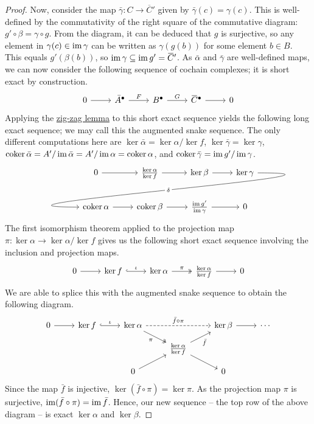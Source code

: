 \documentclass[a4paper,12pt]{article}
\begin{document}
\begin{proof}
    Now, consider the map $\bar{\gamma} \colon C \to \overbar{C}'$ given by $\bar{\gamma}(c) = \gamma(c)$.
    This is well-defined by the commutativity of the right square of the commutative diagram: $g' \circ \beta = \gamma \circ g$.
    From the diagram, it can be deduced that $g$ is surjective, so any element in $\gamma(c) \in \operatorname{im} \gamma$ can be written as $\gamma(g(b))$ for some element $b \in B$.
    This equals $g'(\beta(b))$, so $\im \gamma \subseteq \im g' = \overbar{C}'$.
    As $\bar{\alpha}$ and $\bar{\gamma}$ are well-defined maps, we can now consider the following sequence of cochain complexes; it is short exact by construction.
    \[\begin{tikzcd}
	0 & {\bar{A}^\bullet} & {B^\bullet} & {\overbar{C}^\bullet} & 0
	\arrow[from=1-1, to=1-2]
	\arrow["F", from=1-2, to=1-3]
	\arrow["G", from=1-3, to=1-4]
	\arrow[from=1-4, to=1-5]
    \end{tikzcd}\]
    Applying the \hyperref[lem:zig-zag_lemma]{zig-zag lemma} to this short exact sequence yields the following long exact sequence; we may call this the augmented snake sequence.
    The only different computations here are $\ker \bar{\alpha} = \ker \alpha / \ker f$, $\ker \bar{\gamma} = \ker \gamma$, $\operatorname{coker} \bar{\alpha} = A' / \operatorname{im} \bar{\alpha} = A' / \operatorname{im} \alpha = \operatorname{coker} \alpha$, and $\operatorname{coker} \bar{\gamma} = \operatorname{im} g' / \operatorname{im} \gamma$.
    \[\begin{tikzcd}
        & 0 \ar[r] & \frac{\ker \alpha}{\ker f} \ar[r] & \ker \beta \ar[r] & \ker \gamma \arrow[out=0, in=180, looseness=2, overlay, llld, "\delta"{description}]\\
        & \coker \alpha \ar[r] & \coker \beta \ar[r] & \frac{\im g'}{\im \gamma} \ar[r] & 0
    \end{tikzcd}\]
    The first isomorphism theorem applied to the projection map $\pi \colon \ker \alpha \to \ker \alpha / \ker f$ gives us the following short exact sequence involving the inclusion and projection maps. 
    \[\begin{tikzcd}
	0 & {\ker f} & {\ker \alpha} & {\frac{\ker \alpha}{\ker f}} & 0
	\arrow[from=1-1, to=1-2]
	\arrow["\iota", hook, from=1-2, to=1-3]
	\arrow["\pi", two heads, from=1-3, to=1-4]
	\arrow[from=1-4, to=1-5]
    \end{tikzcd}\]
    We are able to splice this with the augmented snake sequence to obtain the following diagram.
    \[\begin{tikzcd}[row sep=small]
	0 & {\ker f} & {\ker \alpha} && {\ker \beta} & \cdots \\
	&&& {\frac{\ker \alpha}{\ker f}} \\
	&& 0 && 0
	\arrow[from=1-1, to=1-2]
	\arrow["\iota", hook, from=1-2, to=1-3]
	\arrow["{\bar{f} \circ \pi}", dashed, from=1-3, to=1-5]
	\arrow["\pi"', two heads, from=1-3, to=2-4]
	\arrow[from=1-5, to=1-6]
	\arrow["{\bar{f}}"', from=2-4, to=1-5]
	\arrow[from=2-4, to=3-5]
	\arrow[from=3-3, to=2-4]
    \end{tikzcd}\]
    Since the map $\bar{f}$ is injective, $\ker (\bar{f} \circ \pi) = \ker \pi$.
    As the projection map $\pi$ is surjective, $\operatorname{im} (\bar{f} \circ \pi) = \operatorname{im} \bar{f}$.
    Hence, our new sequence -- the top row of the above diagram -- is exact $\ker \alpha$ and $\ker \beta$.
    

\end{proof}
\end{document}
